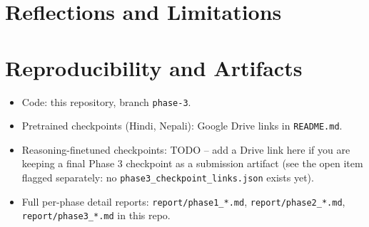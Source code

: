 \documentclass[10pt]{article}
\begin{document}
\section{Reflections and Limitations}

\section{Reproducibility and Artifacts}
\begin{itemize}
  \item Code: this repository, branch \texttt{phase-3}.
  \item Pretrained checkpoints (Hindi, Nepali): Google Drive links in \texttt{README.md}.
  \item Reasoning-finetuned checkpoints: TODO -- add a Drive link here if you
  are keeping a final Phase 3 checkpoint as a submission artifact (see the
  open item flagged separately: no \texttt{phase3\_checkpoint\_links.json}
  exists yet).
  \item Full per-phase detail reports: \texttt{report/phase1\_*.md},
  \texttt{report/phase2\_*.md}, \texttt{report/phase3\_*.md} in this repo.
\end{itemize}
\end{document}
